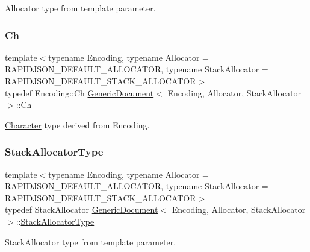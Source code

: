 Allocator type from template parameter. 

\mbox{\label{classGenericDocument_a6f5b0b7b6626508d094ae67490269700}} 
\subsubsection{\texorpdfstring{Ch}{Ch}}
{\footnotesize\ttfamily template$<$typename Encoding, typename Allocator = R\+A\+P\+I\+D\+J\+S\+O\+N\+\_\+\+D\+E\+F\+A\+U\+L\+T\+\_\+\+A\+L\+L\+O\+C\+A\+T\+OR, typename Stack\+Allocator = R\+A\+P\+I\+D\+J\+S\+O\+N\+\_\+\+D\+E\+F\+A\+U\+L\+T\+\_\+\+S\+T\+A\+C\+K\+\_\+\+A\+L\+L\+O\+C\+A\+T\+OR$>$ \\
typedef Encoding\+::\+Ch \hyperlink{classGenericDocument}{Generic\+Document}$<$ Encoding, Allocator, Stack\+Allocator $>$\+::\hyperlink{classGenericValue_ade0e0ce64ccd5d852da57a35e720bafb}{Ch}}



\hyperlink{structCharacter}{Character} type derived from Encoding. 

\mbox{\label{classGenericDocument_a4765969f2292442eef42b28388e1f75b}} 
\subsubsection{\texorpdfstring{Stack\+Allocator\+Type}{StackAllocatorType}}
{\footnotesize\ttfamily template$<$typename Encoding, typename Allocator = R\+A\+P\+I\+D\+J\+S\+O\+N\+\_\+\+D\+E\+F\+A\+U\+L\+T\+\_\+\+A\+L\+L\+O\+C\+A\+T\+OR, typename Stack\+Allocator = R\+A\+P\+I\+D\+J\+S\+O\+N\+\_\+\+D\+E\+F\+A\+U\+L\+T\+\_\+\+S\+T\+A\+C\+K\+\_\+\+A\+L\+L\+O\+C\+A\+T\+OR$>$ \\
typedef Stack\+Allocator \hyperlink{classGenericDocument}{Generic\+Document}$<$ Encoding, Allocator, Stack\+Allocator $>$\+::\hyperlink{classGenericDocument_a4765969f2292442eef42b28388e1f75b}{Stack\+Allocator\+Type}}



Stack\+Allocator type from template parameter. 

\mbox{\label{classGenericDocument_a8936205dc215dda029060d7e835e0549}} 
